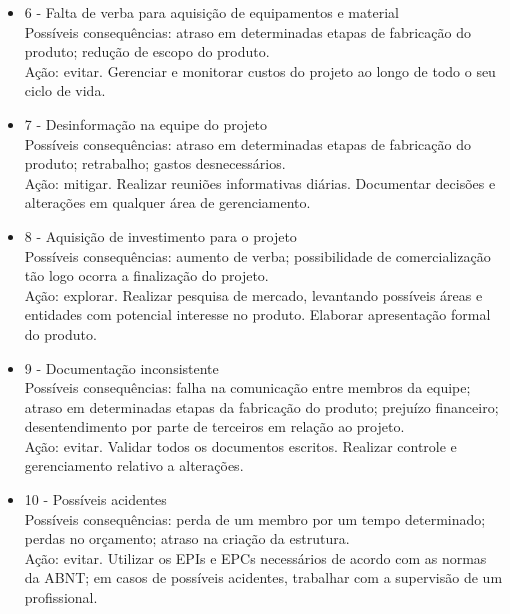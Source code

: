 \begin{itemize}
	\item 6 - Falta de verba para aquisição de equipamentos e material \\ 
	Possíveis consequências: atraso em determinadas etapas de fabricação do produto; redução de escopo do produto. \\
	Ação: evitar. Gerenciar e monitorar custos do projeto ao longo de todo o seu ciclo de vida.
	
	\item 7 - Desinformação na equipe do projeto \\
	Possíveis consequências: atraso em determinadas etapas de fabricação do produto; retrabalho; gastos desnecessários. \\
	Ação: mitigar. Realizar reuniões informativas diárias. Documentar decisões e alterações em qualquer área de gerenciamento.
	
	\item 8 - Aquisição de investimento para o projeto \\
	Possíveis consequências: aumento de verba; possibilidade de comercialização tão logo ocorra a finalização do projeto. \\
	Ação: explorar. Realizar pesquisa de mercado, levantando possíveis áreas e entidades com potencial interesse no produto. Elaborar apresentação formal do produto.
	
	\item 9 - Documentação inconsistente \\
	Possíveis consequências: falha na comunicação entre membros da equipe; atraso em determinadas etapas da fabricação do produto; prejuízo financeiro; desentendimento por parte de terceiros em relação ao projeto. \\
	Ação: evitar. Validar todos os documentos escritos. Realizar controle e gerenciamento relativo a alterações.
	
	\item 10 - Possíveis acidentes \\
	Possíveis consequências: perda de um membro por um tempo determinado; perdas no orçamento; atraso na criação da estrutura. \\
	Ação: evitar. Utilizar os EPIs e EPCs necessários de acordo com as normas da ABNT; em casos de possíveis acidentes, trabalhar com a supervisão de um profissional.
	
	
\end{itemize}